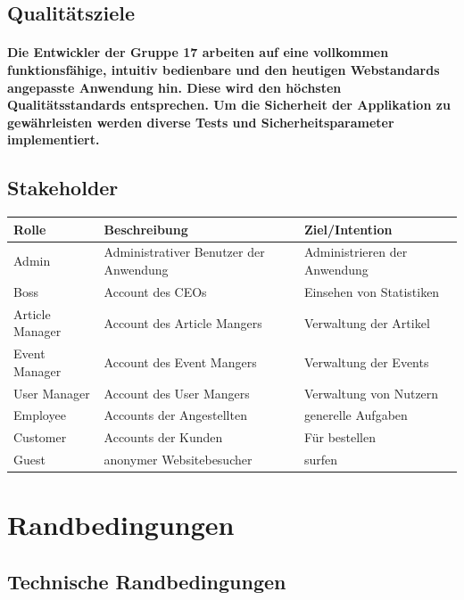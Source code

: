 \documentclass[a4paper]{article}
\begin{document}
\subsection{Qualitätsziele}

\paragraph{Die Entwickler der Gruppe 17 arbeiten auf eine vollkommen funktionsfähige, intuitiv bedienbare und den heutigen Webstandards angepasste Anwendung hin. Diese wird den höchsten Qualitätsstandards entsprechen. Um die Sicherheit der Applikation zu gewährleisten werden diverse Tests und Sicherheitsparameter implementiert.}

\subsection{Stakeholder}

\begin{longtable}{|l|p{125px}|p{125px}|}
	\hline
	\rowcolor[HTML]{C0C0C0}
	Rolle	& Beschreibung	& Ziel/Intention	\\ \hline
	Admin	& Administrativer Benutzer der Anwendung	& Administrieren der Anwendung	\\ \hline
	Boss	& Account des CEOs	& Einsehen von Statistiken	\\ \hline
	Article Manager	& Account des Article Mangers	& Verwaltung der Artikel	\\ \hline
	Event Manager	& Account des Event Mangers	& Verwaltung der Events	\\ \hline
	User Manager	& Account des User Mangers	& Verwaltung von Nutzern	\\ \hline
	Employee	& Accounts der Angestellten	& generelle Aufgaben	\\ \hline
	Customer	& Accounts der Kunden	& Für bestellen	\\ \hline
	Guest	& anonymer Websitebesucher	& surfen	\\ \hline
	
\end{longtable}

\section{Randbedingungen}

\subsection{Technische Randbedingungen}
\end{document}
